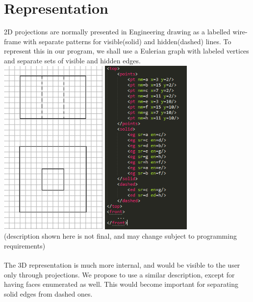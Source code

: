 \documentclass[
11pt, %
english, %
singlespacing, %
headsepline, %
]{MastersDoctoralThesis} %
\begin{document}
\section{Representation}
2D projections are normally presented in Engineering drawing as a labelled wire-frame with separate patterns for visible(solid) and hidden(dashed) lines. To represent this in our program, we shall use a Eulerian graph with labeled vertices and separate sets of visible and hidden edges.\\
 \includegraphics[height = 250pt]{2d-3d-1}
\hspace{42mm} \includegraphics[height = 250pt]{2d-3d-2} \\
(description shown here is not final, and may change subject to programming requirements)\\ \\
The 3D representation is much more internal, and would be visible to the user only through projections. We propose to use a similar description, except for having faces enumerated as well. This would become important for separating solid edges from dashed ones.
\end{document}
